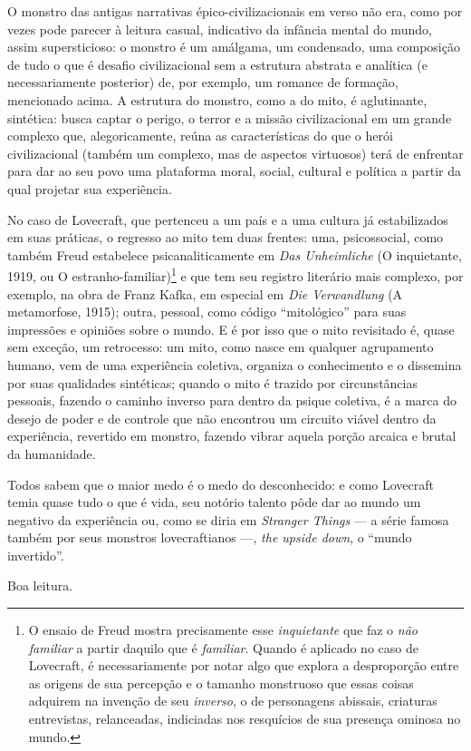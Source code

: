 O monstro das antigas narrativas épico-civilizacionais em verso não era,
como por vezes pode parecer à leitura casual, indicativo da infância
mental do mundo, assim supersticioso: o monstro é um amálgama, um
condensado, uma composição de tudo o que é desafio civilizacional sem a
estrutura abstrata e analítica (e necessariamente posterior) de, por
exemplo, um romance de formação, mencionado acima. A estrutura do
monstro, como a do mito, é aglutinante, sintética: busca captar o
perigo, o terror e a missão civilizacional em um grande complexo que,
alegoricamente, reúna as características do que o herói civilizacional
(também um complexo, mas de aspectos virtuosos) terá de enfrentar para
dar ao seu povo uma plataforma moral, social, cultural e política a
partir da qual projetar sua experiência.

No caso de Lovecraft, que pertenceu a um país e a uma cultura já
estabilizados em suas práticas, o regresso ao mito tem duas frentes:
uma, psicossocial, como também Freud estabelece psicanaliticamente em
\emph{Das Unheimliche} (O inquietante, 1919, ou O
estranho-familiar)\footnote{O ensaio de Freud mostra precisamente esse
  \emph{inquietante} que faz o \emph{não familiar} a partir daquilo que
  é \emph{familiar}. Quando é aplicado no caso de Lovecraft, é
  necessariamente por notar algo que explora a desproporção entre as
  origens de sua percepção e o tamanho monstruoso que essas
  coisas adquirem na invenção de seu \emph{inverso}, o de personagens abissais,
  criaturas entrevistas, relanceadas, indiciadas nos resquícios de sua
  presença ominosa no mundo.} e que tem seu registro literário mais
complexo, por exemplo, na obra de Franz Kafka, em especial em \emph{Die
Verwandlung} (A metamorfose, 1915); outra, pessoal, como código
``mitológico'' para suas impressões e opiniões sobre o mundo. E é por
isso que o mito revisitado é, quase sem exceção, um retrocesso: um mito,
como nasce em qualquer agrupamento humano, vem de uma experiência
coletiva, organiza o conhecimento e o dissemina por suas qualidades
sintéticas; quando o mito é trazido por circunstâncias pessoais, fazendo
o caminho inverso para dentro da psique coletiva, é a marca do desejo de
poder e de controle que não encontrou um circuito viável dentro da
experiência, revertido em monstro, fazendo vibrar aquela porção arcaica
e brutal da humanidade.

Todos sabem que o maior medo é o medo do desconhecido: e como Lovecraft
temia quase tudo o que é vida, seu notório talento pôde dar ao mundo um
negativo da experiência ou, como se diria em \emph{Stranger Things} ---
a série famosa também por seus monstros lovecraftianos ---, \emph{the
upside down}, o ``mundo invertido''.

Boa leitura.

